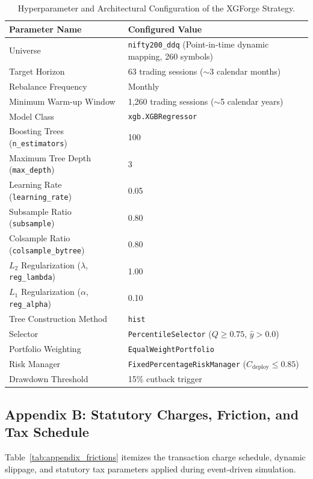 \begin{table}[htbp]
\centering
\caption{Hyperparameter and Architectural Configuration of the XGForge Strategy.}
\label{tab:appendix_hyperparams}
\begin{tabular}{ll}
\hline\hline
\textbf{Parameter Name} & \textbf{Configured Value} \\
\hline
Universe & \texttt{nifty200\_ddq} (Point-in-time dynamic mapping, 260 symbols) \\
Target Horizon & 63 trading sessions ($\sim$3 calendar months) \\
Rebalance Frequency & Monthly \\
Minimum Warm-up Window & 1,260 trading sessions ($\sim$5 calendar years) \\
Model Class & \texttt{xgb.XGBRegressor} \\
Boosting Trees (\texttt{n\_estimators}) & 100 \\
Maximum Tree Depth (\texttt{max\_depth}) & 3 \\
Learning Rate (\texttt{learning\_rate}) & 0.05 \\
Subsample Ratio (\texttt{subsample}) & 0.80 \\
Colsample Ratio (\texttt{colsample\_bytree}) & 0.80 \\
$L_2$ Regularization ($\lambda$, \texttt{reg\_lambda}) & 1.00 \\
$L_1$ Regularization ($\alpha$, \texttt{reg\_alpha}) & 0.10 \\
Tree Construction Method & \texttt{hist} \\
Selector & \texttt{PercentileSelector} ($Q \ge 0.75$, $\hat{y} > 0.0$) \\
Portfolio Weighting & \texttt{EqualWeightPortfolio} \\
Risk Manager & \texttt{FixedPercentageRiskManager} ($C_{\text{deploy}} \le 0.85$) \\
Drawdown Threshold & 15\% cutback trigger \\
\hline\hline
\end{tabular}
\end{table}

\subsection*{Appendix B: Statutory Charges, Friction, and Tax Schedule}
Table~\ref{tab:appendix_frictions} itemizes the transaction charge schedule, dynamic slippage, and statutory tax parameters applied during event-driven simulation.

